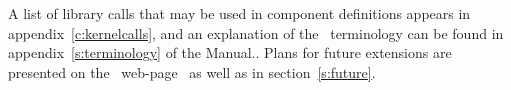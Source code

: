 A list of library calls that may be used in component definitions
appears in appendix~\ref{c:kernelcalls}, and
an explanation of the \MCS\ terminology can be
found in appendix~\ref{s:terminology} of the Manual..
Plans for future extensions are presented on the \MCS\ web-page~\cite{mcstas_webpage} as well as in section~\ref{s:future}.






